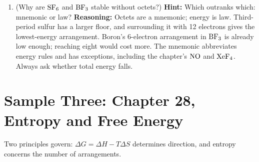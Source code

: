 \begin{enumerate}[itemsep=3pt]
\item (Why are $\mathrm{SF_6}$ and $\mathrm{BF_3}$ stable without octets?) \textbf{Hint:} Which outranks which: mnemonic or law? \textbf{Reasoning:} Octets are a mnemonic; energy is law. Third-period sulfur has a larger floor, and surrounding it with 12 electrons gives the lowest-energy arrangement. Boron's 6-electron arrangement in $\mathrm{BF_3}$ is already low enough; reaching eight would cost more. The mnemonic abbreviates energy rules and has exceptions, including the chapter's $\mathrm{NO}$ and $\mathrm{XeF_4}$. Always ask whether total energy falls.
\end{enumerate}

\section{Sample Three: Chapter 28, Entropy and Free Energy}

Two principles govern: $\Delta G = \Delta H - T\Delta S$ determines direction, and entropy concerns the number of arrangements.

